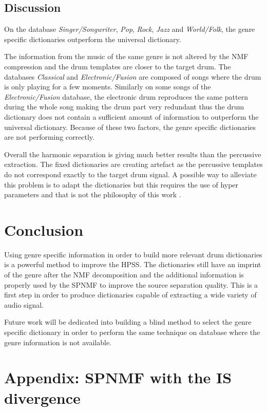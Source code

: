 \documentclass{article}
\begin{document}
\subsection{Discussion}


On the database \emph{Singer/Songwriter}, \emph{Pop}, \emph{Rock}, \emph{Jazz} and \emph{World/Folk}, the genre specific dictionaries outperform the universal dictionary. 

The information from the music of the same genre is not altered by the NMF compression and the drum templates are closer to the target drum.  
The databases \emph{Classical} and \emph{Electronic/Fusion} are composed of songs where the drum is only playing for a few moments. Similarly on some songs of the \emph{Electronic/Fusion} database, the electronic drum reproduces the same pattern during the whole song making the drum part very redundant thus the drum dictionary does not contain a sufficient amount of information to outperform the universal dictionary. Because of these two factors, the genre specific dictionaries are not performing correctly.

Overall the harmonic separation is giving much better results than the percussive extraction. The fixed dictionaries are creating artefact as the percussive templates do not correspond exactly to the target drum signal. A possible way to alleviate this problem is to adapt the dictionaries but this requires the use of hyper parameters and that is not the philosophy of this work \cite{laroche2015structuredhidden}.



\section{Conclusion}\label{sec:conclusion}

Using genre specific information in order to build more relevant drum dictionaries is a powerful method to improve the HPSS. The dictionaries still have an imprint of the genre after the NMF decomposition and the additional information is properly used by the SPNMF to improve the source separation quality. This is a first step in order to produce dictionaries capable of extracting a wide variety of audio signal. 

Future work will be dedicated into building a blind method to select the genre specific dictionary in order to perform the same technique on database where the genre information is not available. 


\section{Appendix: SPNMF with the IS divergence}\label{ISdisteq}
 
\end{document}
